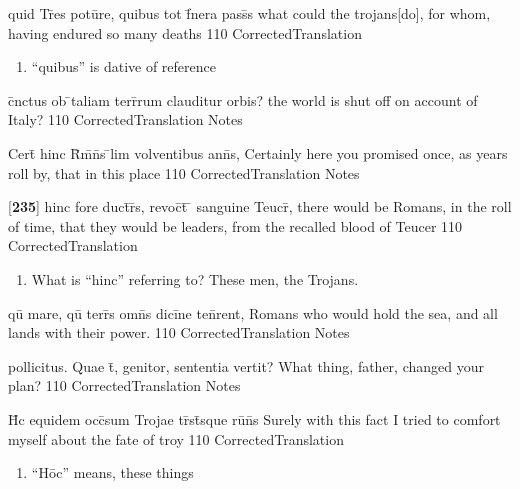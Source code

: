 \latline
  {quid Tr\={}es potu\={}re, quibus tot f\={}nera pass\={\macron {\i}}s}
  { what could the trojans[do], for whom, having endured so many deaths}
  {110}
  { CorrectedTranslation }
  { \begin{enumerate}
  	\item ``quibus'' is dative of reference
  \end{enumerate} }


\latline
  {c\={}nctus ob \={}taliam terr\={}rum clauditur orbis?}
  { the world is shut off on account of Italy? }
  {110}
  { CorrectedTranslation }
  { Notes }


\latline
  {Cert\={} hinc R\={}m\={}n\={}s \={}lim volventibus ann\={\macron {\i}}s,}
  { Certainly here you promised once, as years roll by, that in this place }
  {110}
  { CorrectedTranslation }
  { Notes }


\latline
  {[\textbf{235}] hinc fore duct\={}r\={}s, revoc\={}t\={} \={} sanguine Teucr\={\macron {\i}},}
  { there would be Romans, in the roll of time, that they would be leaders, from the recalled blood of Teucer }
  {110}
  { CorrectedTranslation }
  { \begin{enumerate}
  	\item What is ``hinc'' referring to?  These men, the Trojans.
  \end{enumerate} }


\latline
  {qu\={\macron {\i}} mare, qu\={\macron {\i}} terr\={}s omn\={\macron {\i}}s dici\={}ne ten\={}rent,}
  { Romans who would hold the sea, and all lands with their power. }
  {110}
  { CorrectedTranslation }
  { Notes }


\latline
  {pollicitus.  Quae t\={}, genitor, sententia vertit?}
  { What thing, father, changed your plan? }
  {110}
  { CorrectedTranslation }
  { Notes }


\latline
  {H\={}c equidem occ\={}sum Trojae tr\={\macron {\i}}st\={\macron {\i}}sque ru\={\macron {\i}}n\={}s}
  { Surely with this fact I tried to comfort myself about the fate of troy }
  {110}
  { CorrectedTranslation }
  { \begin{enumerate}
  	\item ``H\={o}c'' means, these things
  \end{enumerate} }


